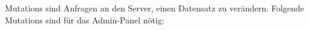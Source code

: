 Mutations sind Anfragen an den Server, einen Datensatz zu verändern.
Folgende Mutations sind für das Admin-Panel nötig: